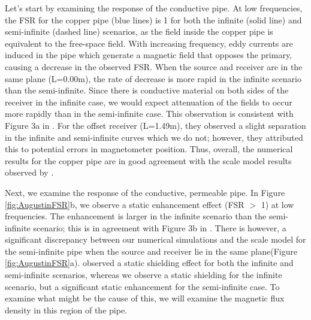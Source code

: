 Let's start by examining the response of the conductive pipe. At low frequencies, the FSR for the copper pipe (blue lines) is 1 for both the infinite (solid line) and semi-infinite (dashed line) scenarios, as the field inside the copper pipe is equivalent to the free-space field. With increasing frequency, eddy currents are induced in the pipe which generate a magnetic field that opposes the primary, causing a decrease in the observed FSR. When the source and receiver are in the same plane (L=0.00m), the rate of decrease is more rapid in the infinite scenario than the semi-infinite. Since there is conductive material on both sides of the receiver in the infinite case, we would expect attenuation of the fields to occur more rapidly than in the semi-infinite case. This observation is consistent with Figure 3a in \cite{Augustin1989}. For the offset receiver (L=1.49m), they observed a slight separation in the infinite and semi-infinite curves which we do not; however, they attributed this to potential errors in magnetometer position. Thus, overall, the numerical results for the copper pipe are in good agreement with the scale model results observed by \cite{Augustin1989}.

Next, we examine the response of the conductive, permeable pipe. In Figure \ref{fig:AugustinFSR}b, we observe a static enhancement effect (FSR $>$ 1) at low frequencies. The enhancement is larger in the infinite scenario than the semi-infinite scenario; this is in agreement with Figure 3b in \cite{Augustin1989}. There is however, a significant discrepancy between our numerical simulations and the scale model for the semi-infinite pipe when the source and receiver lie in the same plane(Figure \ref{fig:AugustinFSR}a). \cite{Augustin1989} observed a static shielding effect for both the infinite and semi-infinite scenarios, whereas we observe a static shielding for the infinite scenario, but a significant static enhancement for the semi-infinite case. To examine what might be the cause of this, we will examine the magnetic flux density in this region of the pipe.

